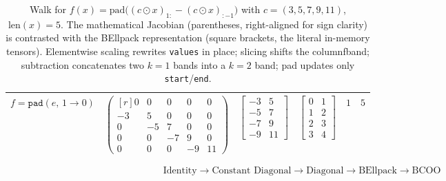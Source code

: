 \documentclass{article}
\begin{document}
\begin{table}
\begin{tabular}{@{}l c c c c c@{}}
  $f = \texttt{pad}(e,\,1\!\rightarrow\!0)$ &
    $\begin{pmatrix*}[r]
       0 & 0 & 0 & 0 &  0 \\
      -3 & 5 & 0 & 0 &  0 \\
       0 & -5 & 7 & 0 &  0 \\
       0 & 0 & -7 & 9 &  0 \\
       0 & 0 & 0 & -9 & 11
    \end{pmatrix*}$ &
    $\begin{bmatrix}
      -3 & 5 \\
      -5 & 7 \\
      -7 & 9 \\
      -9 & 11
    \end{bmatrix}$ &
    $\begin{bmatrix}
      0 & 1 \\
      1 & 2 \\
      2 & 3 \\
      3 & 4
    \end{bmatrix}$ &
    $1$ & $5$ \\
  \bottomrule
  \end{tabular}
  \caption{Walk for $f(x) = \mathrm{pad}\bigl((c\odot x)_{1:} - (c\odot x)_{:-1}\bigr)$ with $c=(3,5,7,9,11)$, $\mathrm{len}(x)=5$.
  The mathematical Jacobian (parentheses, right-aligned for sign clarity) is contrasted with the BEllpack
  representation (square brackets, the literal in-memory tensors). Elementwise scaling rewrites
  \texttt{values} in place; slicing shifts the columnfband; subtraction concatenates two $k{=}1$ bands
  into a $k{=}2$ band; pad updates only \texttt{start}/\texttt{end}.}
  \end{table}
  \endgroup

\begin{equation*}
\text{Identity} \rightarrow \text{Constant Diagonal} \rightarrow \text{Diagonal} \rightarrow \text{BEllpack} \rightarrow \text{BCOO}
\end{equation*}
\end{document}
